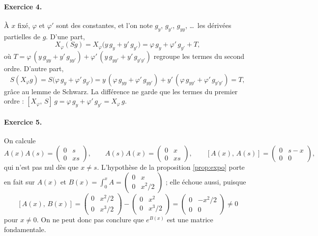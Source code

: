 \documentclass[11pt,a4paper]{article}
\theoremstyle{plain}
\theoremstyle{definition}
\theoremstyle{remark}
\newcommand{\cro}[2]{\left[#1,\,#2\right]}
\begin{document}
\paragraph{Exercice 4.} À $x$ fixé, $\varphi$ et $\varphi'$ sont des constantes, et l'on note $g_y$, $g_{y'}$, $g_{yy}$, \dots\ les dérivées partielles de $g$. D'une part,
\[
  X_\varphi(S g) = X_\varphi\big(y\,g_y + y'\,g_{y'}\big)
  = \varphi\,g_y + \varphi'\,g_{y'} + T,
\]
où $T = \varphi\,(y\,g_{yy} + y'\,g_{yy'}) + \varphi'\,(y\,g_{yy'} + y'\,g_{y'y'})$ regroupe les termes du second ordre. D'autre part,
\[
  S(X_\varphi g) = S\big(\varphi\,g_y + \varphi'\,g_{y'}\big)
  = y\,(\varphi\,g_{yy} + \varphi'\,g_{yy'}) + y'\,(\varphi\,g_{yy'} + \varphi'\,g_{y'y'}) = T,
\]
grâce au lemme de Schwarz. La différence ne garde que les termes du premier ordre : $\cro{X_\varphi}{S}\,g = \varphi\,g_y + \varphi'\,g_{y'} = X_\varphi\,g$.

\paragraph{Exercice 5.} On calcule
\[
  A(x)A(s) = \begin{pmatrix} 0 & s \\ 0 & xs \end{pmatrix},
  \qquad
  A(s)A(x) = \begin{pmatrix} 0 & x \\ 0 & xs \end{pmatrix},
  \qquad
  \cro{A(x)}{A(s)} = \begin{pmatrix} 0 & s - x \\ 0 & 0 \end{pmatrix},
\]
qui n'est pas nul dès que $x \neq s$. L'hypothèse de la proposition \ref{prop:expo} porte en fait sur $A(x)$ et $B(x) = \int_0^x A = \begin{pmatrix} 0 & x \\ 0 & x^2/2 \end{pmatrix}$ ; elle échoue aussi, puisque
\[
  \cro{A(x)}{B(x)} = \begin{pmatrix} 0 & x^2/2 \\ 0 & x^3/2 \end{pmatrix} - \begin{pmatrix} 0 & x^2 \\ 0 & x^3/2 \end{pmatrix} = \begin{pmatrix} 0 & -x^2/2 \\ 0 & 0 \end{pmatrix} \neq 0
\]
pour $x \neq 0$. On ne peut donc pas conclure que $e^{B(x)}$ est une matrice fondamentale.
\end{document}
